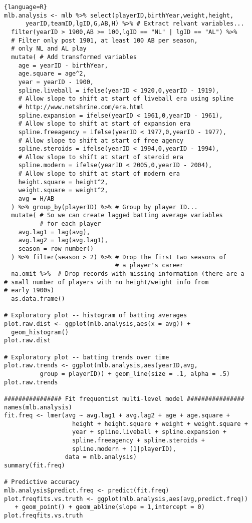 \documentclass[10pt,a4paper]{article}
\begin{document}
\begin{lstlisting}{language=R}
mlb.analysis <- mlb %>% select(playerID,birthYear,weight,height,
      yearID,teamID,lgID,G,AB,H) %>% # Extract relvant variables...
  filter(yearID > 1900,AB >= 100,lgID == "NL" | lgID == "AL") %>% 
  # Filter only post 1901, at least 100 AB per season, 
  # only NL and AL play
  mutate( # Add transformed variables
    age = yearID - birthYear,
    age.square = age^2,
    year = yearID - 1900,
    spline.liveball = ifelse(yearID < 1920,0,yearID - 1919), 
    # Allow slope to shift at start of liveball era using spline 
    # http://www.netshrine.com/era.html
    spline.expansion = ifelse(yearID < 1961,0,yearID - 1961), 
    # Allow slope to shift at start of expansion era
    spline.freeagency = ifelse(yearID < 1977,0,yearID - 1977), 
    # Allow slope to shift at start of free agency
    spline.steroids = ifelse(yearID < 1994,0,yearID - 1994), 
    # Allow slope to shift at start of steroid era
    spline.modern = ifelse(yearID < 2005,0,yearID - 2004), 
    # Allow slope to shift at start of modern era
    height.square = height^2,
    weight.square = weight^2,
    avg = H/AB
  ) %>% group_by(playerID) %>% # Group by player ID...
  mutate( # So we can create lagged batting average variables 
          # for each player
    avg.lag1 = lag(avg),
    avg.lag2 = lag(avg.lag1),
    season = row_number()
  ) %>% filter(season > 2) %>% # Drop the first two seasons of 
                               # a player's career
  na.omit %>%  # Drop records with missing information (there are a 
# small number of players with no height/weight info from 
# early 1900s)
  as.data.frame()

# Exploratory plot -- histogram of batting averages
plot.raw.dist <- ggplot(mlb.analysis,aes(x = avg)) +
  geom_histogram()
plot.raw.dist

# Exploratory plot -- batting trends over time
plot.raw.trends <- ggplot(mlb.analysis,aes(yearID,avg, 
          group = playerID)) + geom_line(size = .1, alpha = .5) 
plot.raw.trends

################ Fit frequentist multi-level model ################
names(mlb.analysis)
fit.freq <- lmer(avg ~ avg.lag1 + avg.lag2 + age + age.square + 
                   height + height.square + weight + weight.square + 
                   year + spline.liveball + spline.expansion + 
                   spline.freeagency + spline.steroids + 
                   spline.modern + (1|playerID),
                 data = mlb.analysis)
summary(fit.freq)

# Predictive accuracy
mlb.analysis$predict.freq <- predict(fit.freq)
plot.freqfits.vs.truth <- ggplot(mlb.analysis,aes(avg,predict.freq)) 
   + geom_point() + geom_abline(slope = 1,intercept = 0)
plot.freqfits.vs.truth


\end{lstlisting}
\end{document}
